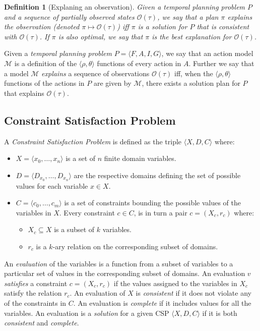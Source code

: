 \documentclass[letterpaper]{article} %
\newcommand{\tup}[1]{{\langle #1 \rangle}}
\newtheorem{definition}[theorem]{Definition}
\begin{document}
\begin{definition}[Explaning an observation]
Given a {\em temporal planning problem} $P$ and a sequence of partially observed states $\mathcal{O}(\tau)$, we say that a plan $\pi$ {\em explains the observation} (denoted $\pi\mapsto\mathcal{O}(\tau)$) iff $\pi$ is a solution for $P$ that is {\em  consistent} with $\mathcal{O}(\tau)$. If $\pi$ is also optimal, we say that $\pi$ is the {\em best explanation} for $\mathcal{O}(\tau)$. 
\end{definition}

Given a {\em temporal planning problem} $P=\tup{F,A,I,G}$, we say that an action model $\mathcal{M}$ is a definition of the $\tup{\rho,\theta}$ functions of every action in $A$. Further we say that a model $\mathcal{M}$ {\em explains} a sequence of observations $\mathcal{O}(\tau)$ iff, when the $\tup{\rho,\theta}$ functions of the actions in $P$ are given by $\mathcal{M}$, there exists a solution plan for $P$ that explains $\mathcal{O}(\tau)$.


\subsection{Constraint Satisfaction Problem}
A {\em Constraint Satisfaction Problem} is defined as the triple $\tup{X,D,C}$ where:
\begin{itemize}
\item $X=\tup{x_0, \ldots, x_n}$ is a set of $n$ finite domain variables.
\item $D=\tup{D_{x_0}, \ldots, D_{x_n}}$ are the respective domains defining the set of possible values for each variable $x\in X$.
\item $C=\tup{c_0, \ldots, c_m}$ is a set of constraints bounding the possible values of the variables in $X$. Every constraint $c\in C$, is in turn a pair $c=(X_c,r_c)$ where:
\begin{itemize}
\item $X_c\subseteq X$ is a subset of $k$ variables.
\item $r_c$ is a $k$-ary relation on the corresponding subset of domains.
\end{itemize}
\end{itemize}

An {\em evaluation} of the variables is a function from a subset of variables to a particular set of values in the corresponding subset of domains. An evaluation $v$ {\em satisfies} a constraint $c=(X_c,r_c)$ if the values assigned to the variables in $X_c$ satisfy the relation $r_c$. An evaluation of $X$ is {\em consistent} if it does not violate any of the constraints in $C$. An evaluation is {\em complete} if it includes values for all the variables. An evaluation is a {\em solution} for a given CSP $\tup{X,D,C}$ if it is both {\em consistent} and {\em complete}. 
\end{document}
